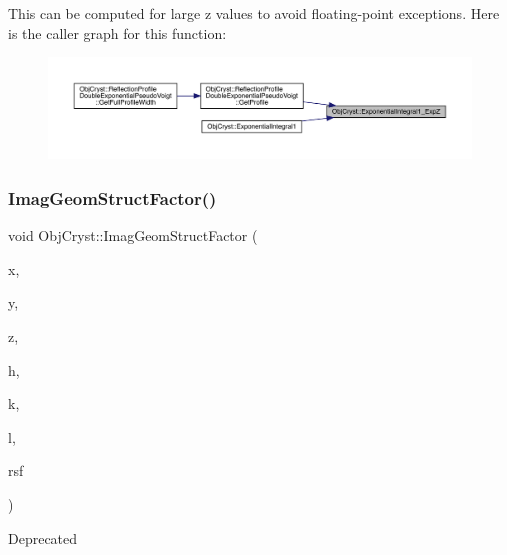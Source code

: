 This can be computed for large z values to avoid floating-\/point exceptions. Here is the caller graph for this function\+:
\nopagebreak
\begin{figure}[H]
\begin{center}
\leavevmode
\includegraphics[width=350pt]{namespace_obj_cryst_a74bf8a13319fe6f59d1bcd6da225a175_icgraph}
\end{center}
\end{figure}
\mbox{\label{namespace_obj_cryst_aa416ad4f8edfaabd682ccbc7cf95a29b}} 
\subsubsection{\texorpdfstring{ImagGeomStructFactor()}{ImagGeomStructFactor()}}
{\footnotesize\ttfamily void Obj\+Cryst\+::\+Imag\+Geom\+Struct\+Factor (\begin{DoxyParamCaption}\item[{const R\+E\+AL}]{x,  }\item[{const R\+E\+AL}]{y,  }\item[{const R\+E\+AL}]{z,  }\item[{const Cryst\+Vector\+\_\+\+R\+E\+AL \&}]{h,  }\item[{const Cryst\+Vector\+\_\+\+R\+E\+AL \&}]{k,  }\item[{const Cryst\+Vector\+\_\+\+R\+E\+AL \&}]{l,  }\item[{Cryst\+Vector\+\_\+\+R\+E\+AL \&}]{rsf }\end{DoxyParamCaption})}

\begin{DoxyRefDesc}{Deprecated}
\item[\mbox{\hyperlink{deprecated__deprecated000003}{Deprecated}}]\end{DoxyRefDesc}
\mbox{\label{namespace_obj_cryst_aed0db0afe1df8a2e8879aac4ac466ac0}} 
